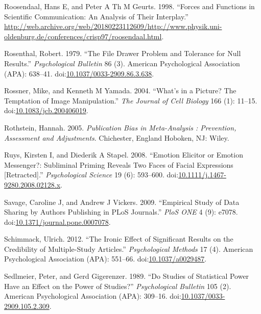 \documentclass[a5paper]{book}
\begin{document}
\hypertarget{ref-roosendaal1998}{}
Roosendaal, Hans E, and Peter A Th M Geurts. 1998. ``Forces and
Functions in Scientific Communication: An Analysis of Their Interplay.''
\url{http://web.archive.org/web/20180223112609/http://www.physik.uni-oldenburg.de/conferences/crisp97/roosendaal.html}.

\hypertarget{ref-doi:10.1037ux2f0033-2909.86.3.638}{}
Rosenthal, Robert. 1979. ``The File Drawer Problem and Tolerance for
Null Results.'' \emph{Psychological Bulletin} 86 (3). American
Psychological Association (APA): 638--41.
doi:\href{https://doi.org/10.1037/0033-2909.86.3.638}{10.1037/0033-2909.86.3.638}.

\hypertarget{ref-doi:10.1083ux2fjcb.200406019}{}
Rossner, Mike, and Kenneth M Yamada. 2004. ``What's in a Picture? The
Temptation of Image Manipulation.'' \emph{The Journal of Cell Biology}
166 (1): 11--15.
doi:\href{https://doi.org/10.1083/jcb.200406019}{10.1083/jcb.200406019}.

\hypertarget{ref-isbn:9780470870150}{}
Rothstein, Hannah. 2005. \emph{Publication Bias in Meta-Analysis :
Prevention, Assessment and Adjustments}. Chichester, England Hoboken,
NJ: Wiley.

\hypertarget{ref-doi:10.1111ux2fj.1467-9280.2008.02128.x}{}
Ruys, Kirsten I, and Diederik A Stapel. 2008. ``Emotion Elicitor or
Emotion Messenger?: Subliminal Priming Reveals Two Faces of Facial
Expressions {[}Retracted{]}.'' \emph{Psychological Science} 19 (6):
593--600.
doi:\href{https://doi.org/10.1111/j.1467-9280.2008.02128.x}{10.1111/j.1467-9280.2008.02128.x}.

\hypertarget{ref-doi:10.1371ux2fjournal.pone.0007078}{}
Savage, Caroline J, and Andrew J Vickers. 2009. ``Empirical Study of
Data Sharing by Authors Publishing in PLoS Journals.'' \emph{PloS ONE} 4
(9): e7078.
doi:\href{https://doi.org/10.1371/journal.pone.0007078}{10.1371/journal.pone.0007078}.

\hypertarget{ref-doi:10.1037ux2fa0029487}{}
Schimmack, Ulrich. 2012. ``The Ironic Effect of Significant Results on
the Credibility of Multiple-Study Articles.'' \emph{Psychological
Methods} 17 (4). American Psychological Association (APA): 551--66.
doi:\href{https://doi.org/10.1037/a0029487}{10.1037/a0029487}.

\hypertarget{ref-doi:10.1037ux2f0033-2909.105.2.309}{}
Sedlmeier, Peter, and Gerd Gigerenzer. 1989. ``Do Studies of Statistical
Power Have an Effect on the Power of Studies?'' \emph{Psychological
Bulletin} 105 (2). American Psychological Association (APA): 309--16.
doi:\href{https://doi.org/10.1037/0033-2909.105.2.309}{10.1037/0033-2909.105.2.309}.
\end{document}
